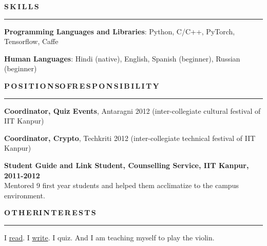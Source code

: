 \documentclass[11pt, a4paper]{article}
\begin{document}
\vspace{10pt}

\textbf{S\,K\,I\,L\,L\,S}
\vspace{5pt}
\hrule
\vspace{7pt}
\textbf{Programming Languages and Libraries}: Python, C/C++, PyTorch, Tensorflow, Caffe

\textbf{Human Languages}: Hindi (native), English, Spanish (beginner), Russian (beginner)

\vspace{10pt}

\textbf{P\,O\,S\,I\,T\,I\,O\,N\,S{\hspace{0.6em}}O\,F{\hspace{0.6em}}R\,E\,S\,P\,O\,N\,S\,I\,B\,I\,L\,I\,T\,Y}
\vspace{5pt}
\hrule
\vspace{7pt}
\textbf{Coordinator, Quiz Events}, Antaragni 2012 (inter-collegiate cultural festival of IIT Kanpur)

\vspace{2pt}

\textbf{Coordinator, Crypto}, Techkriti 2012 (inter-collegiate technical festival of IIT Kanpur)

\vspace{2pt}

\textbf{Student Guide and Link Student, Counselling Service, IIT Kanpur, 2011-2012}\\
Mentored 9 first year students and helped them acclimatize to the campus environment.

\vspace{10pt}
\textbf{O\,T\,H\,E\,R{\hspace{0.6em}}I\,N\,T\,E\,R\,E\,S\,T\,S}
\vspace{5pt}
\hrule
\vspace{7pt}
I \href{https://www.goodreads.com/user/show/25100820-ankan-bansal}{read}. I
\href{https://computervizion.blogspot.com/}{write}. I quiz. And I am teaching myself to play the
violin.
\end{document}
